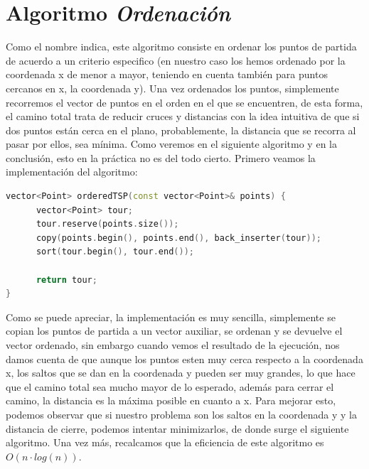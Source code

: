 \documentclass[11pt,openany]{book}
\begin{document}
\section{Algoritmo \textit{Ordenación}}
Como el nombre indica, este algoritmo consiste en ordenar los puntos de partida de
acuerdo a un criterio especifico (en nuestro caso los hemos ordenado por la coordenada
x de menor a mayor, teniendo en cuenta también para puntos cercanos en x, la coordenada y).
Una vez ordenados los puntos, simplemente recorremos el vector de puntos en el orden
en el que se encuentren, de esta forma, el camino total trata de reducir cruces y distancias
con la idea intuitiva de que si dos puntos están cerca en el plano, probablemente, la 
distancia que se recorra al pasar por ellos, sea mínima. Como veremos en el siguiente 
algoritmo y en la conclusión, esto en la práctica no es del todo cierto. Primero veamos 
la implementación del algoritmo:
\begin{lstlisting}[language=C++]
vector<Point> orderedTSP(const vector<Point>& points) {
      vector<Point> tour;
      tour.reserve(points.size());
      copy(points.begin(), points.end(), back_inserter(tour));
      sort(tour.begin(), tour.end());
        
      return tour;
}      
\end{lstlisting}
Como se puede apreciar, la implementación es muy sencilla, simplemente se copian los puntos
de partida a un vector auxiliar, se ordenan y se devuelve el vector ordenado, sin embargo
cuando vemos el resultado de la ejecución, nos damos cuenta de que aunque los puntos
esten muy cerca respecto a la coordenada x, los saltos que se dan en la coordenada y
pueden ser muy grandes, lo que hace que el camino total sea mucho mayor de lo esperado,
además para cerrar el camino, la distancia es la máxima posible en cuanto a x. Para mejorar
esto, podemos observar que si nuestro problema son los saltos en la coordenada y 
y la distancia de cierre, podemos intentar minimizarlos, de donde surge el siguiente
algoritmo. Una vez más, recalcamos que la eficiencia de este algoritmo es $O(n \cdot log(n))$.
\end{document}
